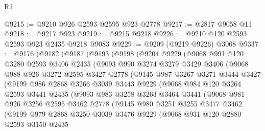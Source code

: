 \begin{lexlean}{R1}
\begin{coremodule}
@9215 := @9210 @926 @2593 @2595 @923 @2778
@9217 := @2817 @9058 @11
@9218 := @9217 @923
@9219 := @9215 @9218
@9226 := @9210 @120 @2593 @2593 @923 @2435 @9218 @9083
@9229 := @9209 (@9219 @9226) @3068
@9337 := @9176
    (@9182
      (@9187
        (@9193
          (@9198
            (@9204
              @9229
              (@9068
                @991
                @120
                @3280
                @2593
                @3406
                @2435
                (@9093
                  @990
                  @3274
                  @3279
                  @3429
                  @3406
                  (@9068
                    @988
                    @926
                    @3272
                    @2595
                    @3427
                    @2778
                    (@9145
                      @987
                      @3267
                      @3271
                      @3444
                      @3427
                      (@9199
                        @986
                        @2868
                        @3266
                        @3039
                        @3443
                        @9229
                        (@9068
                          @984
                          @120
                          @3264
                          @2593
                          @3441
                          @2435
                          (@9093
                            @983
                            @3258
                            @3263
                            @3464
                            @3441
                            (@9068
                              @981
                              @926
                              @3256
                              @2595
                              @3462
                              @2778
                              (@9145
                                @980
                                @3251
                                @3255
                                @3477
                                @3462
                                (@9199
                                  @979
                                  @2868
                                  @3250
                                  @3039
                                  @3476
                                  @9229
                                  (@9068
                                    @931
                                    @120
                                    @2880
                                    @2593
                                    @3150
                                    @2435

\end{coremodule}
\end{lexlean}
